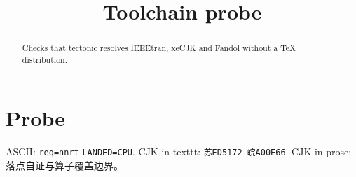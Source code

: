 \documentclass[conference]{IEEEtran}
\begin{document}
\title{Toolchain probe}
\maketitle
\begin{abstract}
Checks that tectonic resolves IEEEtran, xeCJK and Fandol without a TeX distribution.
\end{abstract}
\section{Probe}
ASCII: \texttt{req=nnrt} \texttt{LANDED=CPU}. CJK in texttt: \texttt{苏ED5172 皖A00E66}.
CJK in prose: 落点自证与算子覆盖边界。
\end{document}
